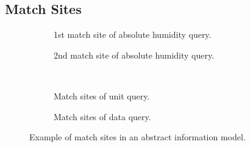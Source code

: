 \subsection{Match Sites}


\begin{figure}[tbp]
  \centering
  \begin{subfigure}[b]{0.48\textwidth}
    \caption{1st match site of absolute humidity query.}
    \label{fig:topics:info:match:absI}
  \end{subfigure}
  \hfill
  \begin{subfigure}[b]{0.48\textwidth}
    \caption{2nd match site of absolute humidity query.}
    \label{fig:topics:info:match:absII}
  \end{subfigure}
  \\
  \begin{subfigure}[b]{0.48\textwidth}
    \caption{Match sites of unit query.}
    \label{fig:topics:info:match:unit}
  \end{subfigure}
  \hfill
  \begin{subfigure}[b]{0.48\textwidth}
    \caption{Match sites of data query.}
    \label{fig:topics:info:match:data}
  \end{subfigure}
  
  \caption[Example of match sites in an abstract information model]{Example of match sites in an abstract information model.}
  \label{fig:topics:info:match}
\end{figure}

